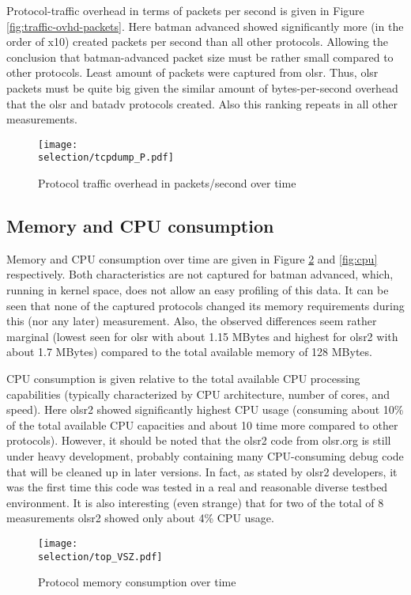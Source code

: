 \documentclass[a4paper,12pt,twoside]{article}
\begin{document}
Protocol-traffic overhead in terms of packets per second is given in
Figure \ref{fig:traffic-ovhd-packets}. Here batman advanced showed
significantly more (in the order of x10) created packets per second
than all other protocols. Allowing the conclusion that batman-advanced
packet size must be rather small compared to other protocols. Least
amount of packets were captured from olsr. Thus, olsr packets must be
quite big given the similar amount of bytes-per-second overhead that
the olsr and batadv protocols created. Also this ranking repeats in
all other measurements.

\begin{figure}[!ht]
\centering
\texttt{[image: \\selection/tcpdump\_P.pdf]}
\caption{Protocol traffic overhead in packets/second over time}
\label{fig:traffic-ovhd-bytes}
\end{figure}


\subsection{Memory and CPU consumption}

Memory and CPU consumption over time are given in Figure \ref{fig:mem}
and \ref{fig:cpu} respectively. Both characteristics are not captured
for batman advanced, which, running in kernel space, does not allow an
easy profiling of this data. It can be seen that none of the captured
protocols changed its memory requirements during this (nor any later)
measurement. Also, the observed differences seem rather marginal
(lowest seen for olsr with about 1.15 MBytes and highest for olsr2 with
about 1.7 MBytes) compared to the total available memory of 128 MBytes.

CPU consumption is given relative to the total available CPU processing
capabilities (typically characterized by CPU architecture, number of
cores, and speed). Here olsr2 showed significantly highest CPU usage
(consuming about 10\% of the total available CPU capacities and about
10 time more compared to other protocols). However, it should be noted
that the olsr2 code from olsr.org is still under heavy development,
probably containing many CPU-consuming debug code that will be cleaned
up in later versions. In fact, as stated by olsr2 developers, it was
the first time this code was tested in a real and reasonable diverse
testbed environment. It is also interesting (even strange) that for
two of the total of 8 measurements olsr2 showed only about 4\% CPU
usage.

\begin{figure}[!ht]
\centering
\texttt{[image: \\selection/top\_VSZ.pdf]}
\caption{Protocol memory consumption over time}
\label{fig:mem}
\end{figure}
\end{document}
